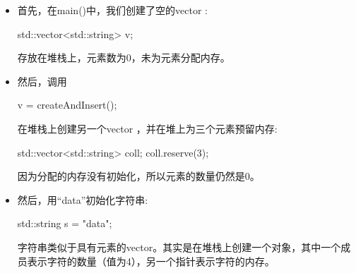 \begin{itemize}
	\item 首先，在main()中，我们创建了空的vector :
\begin{cppcode}
std::vector<std::string> v;
\end{cppcode}
	存放在堆栈上，元素数为0，未为元素分配内存。
	\item 然后，调用
\begin{cppcode}
v = createAndInsert();
\end{cppcode}
	在堆栈上创建另一个vector ，并在堆上为三个元素预留内存:
\begin{cppcode}
std::vector<std::string> coll;
coll.reserve(3);
\end{cppcode}
	因为分配的内存没有初始化，所以元素的数量仍然是0。
	\item 然后，用“data”初始化字符串:
\begin{cppcode}
std::string s = "data";
\end{cppcode}
	字符串类似于具有元素的vector。其实是在堆栈上创建一个对象，其中一个成员表示字符的数量（值为4），另一个指针表示字符的内存。


\end{itemize}

